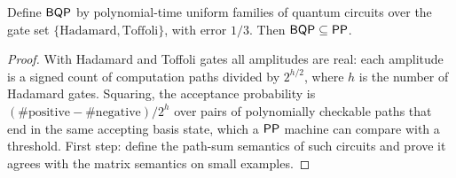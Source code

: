 \begin{theorem}
  \label{thm:frontiers-bqp-pp}
  \notready
  Define $\mathsf{BQP}$ by polynomial-time uniform families of quantum circuits over
  the gate set $\{\mathrm{Hadamard}, \mathrm{Toffoli}\}$, with error $1/3$. Then
  $\mathsf{BQP} \subseteq \mathsf{PP}$.
\end{theorem}
\begin{proof}
  With Hadamard and Toffoli gates all amplitudes are real: each amplitude is a
  signed count of computation paths divided by $2^{h/2}$, where $h$ is the
  number of Hadamard gates. Squaring, the acceptance probability is
  $(\#\text{positive} - \#\text{negative})/2^h$ over pairs of polynomially
  checkable paths that end in the same accepting basis state, which a $\mathsf{PP}$
  machine can compare with a threshold. First step: define the path-sum
  semantics of such circuits and prove it agrees with the matrix semantics on
  small examples.
\end{proof}
